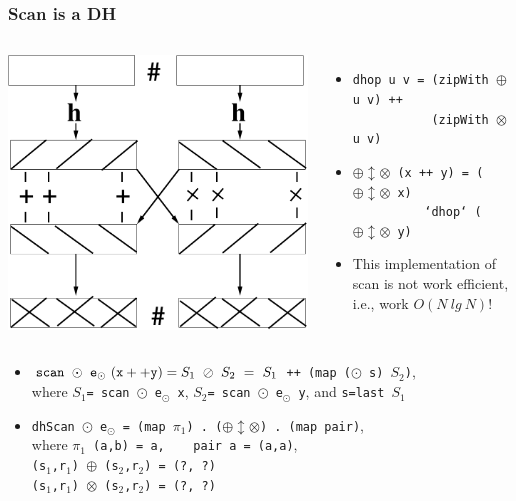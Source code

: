 \documentclass{beamer}
\begin{document}
\begin{frame}[fragile,t]
  \frametitle{Scan is a DH}

\begin{columns}
\includegraphics[height=25ex]{Figures/L2/DH}
\vspace{-3ex}
\begin{itemize}
    \item {\tt dhop u v = (zipWith $\oplus$ u v) ++}\\ 
          {\tt~~~~~~~~~~~(zipWith $\otimes$ u v)}
    \item {\tt $\oplus\updownarrow\otimes$ (x ++ y) = ($\oplus\updownarrow\otimes$ x)}\\
          {\tt~~~~~~~~~~`dhop` ($\oplus\updownarrow\otimes$ y)} 
    \item \alert{This implementation of scan is not work efficient,
                i.e., work $O(N \ lg \ N)$!}
\end{itemize}
\end{columns}


\begin{itemize}
    \item ${\tt scan} \ \odot \ {\tt e}_{\odot} \ {\tt(x++y)} = S_1~\oslash~S_2~=~S_1$
            {\tt ++ (map ($\odot$ s) $S_2$)},\\ 
            where $S_1${\tt = scan $\odot$ e$_{\odot}$ x},
                  $S_2${\tt = scan $\odot$ e$_{\odot}$ y}, and {\tt s=last $S_1$}\medskip
 
    \item {\tt dhScan $\odot$ e$_{\odot}$ = (map $\pi_1$) . ($\oplus\updownarrow\otimes$) . (map pair)},\\
            where {\tt $\pi_1$ (a,b) = a,~~~~pair a = (a,a)},\\
            {\tt (s$_1$,r$_1$) $\oplus$ (s$_2$,r$_2$) = (\alert{?}, \alert{?})}\\
            {\tt (s$_1$,r$_1$) $\otimes$ (s$_2$,r$_2$) = (\alert{?}, \alert{?})}
\end{itemize}

\end{frame}
\end{document}
